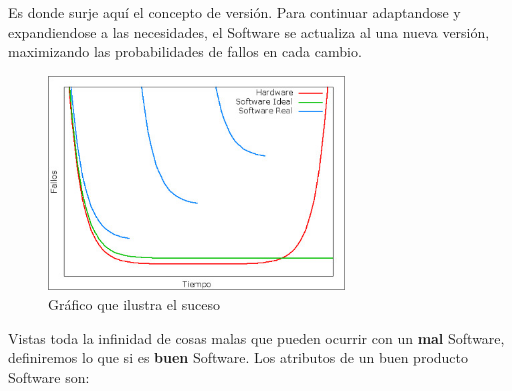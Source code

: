 \newpage

Es donde surje aquí el concepto de versión. Para continuar adaptandose y expandiendose a las necesidades, el
Software se actualiza al una nueva versión, maximizando las probabilidades de fallos en cada cambio.

\begin{figure}[h]
    \centering
    \includegraphics[width=0.7\textwidth]{assets/SoftwareFails.jpeg}
    \caption{Gráfico que ilustra el suceso}
    \label{graph:softwarefails}
\end{figure}

Vistas toda la infinidad de cosas malas que pueden ocurrir con un \textbf{mal} Software, definiremos lo que si es
\textbf{buen} Software. Los atributos de un buen producto Software son:

